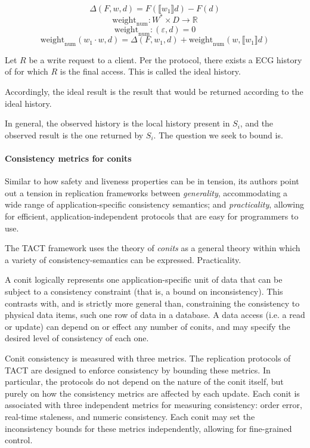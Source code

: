 \[ \Delta(F,w,d) = F(\llbracket w_1 \rrbracket d) - F (d)\]
\[ \textrm{weight}_{\textrm{num}} : W^\ast \times D \to \mathbb{R}\]
\[ \textrm{weight}_{\textrm{num}} : (\varepsilon, d) = 0 \]
\[ \textrm{weight}_{\textrm{num}} (w_1 \cdot w, d) = \Delta(F, w_1, d) + \textrm{weight}_{\textrm{num}} \left(w, \llbracket w_1 \rrbracket d\right) \]

Let $R$ be a write request to a client. Per the protocol, there exists
a ECG history of for which $R$ is the final access. This is called the
ideal history.

Accordingly, the ideal result is the result that would be returned
according to the ideal history.

In general, the observed history is the local history present in
$S_i$, and the observed result is the one returned by $S_i$. The
question we seek to bound is.


\paragraph{Consistency metrics for conits}

Similar to how safety and liveness properties can be in tension, its
authors point out a tension in replication frameworks between
\emph{generality}, accommodating a wide range of application-specific
consistency semantics; and \emph{practicality}, allowing for
efficient, application-independent protocols that are easy for
programmers to use.

The TACT framework uses the theory of
\emph{conits} as a general theory within which a variety of
consistency-semantics can be expressed. Practicality.

A conit logically represents one application-specific unit of data
that can be subject to a consistency constraint (that is, a bound on
inconsistency). This contrasts with, and is strictly more general
than, constraining the consistency to physical data items, such one
row of data in a database. A data access (i.e. a read or update) can
depend on or effect any number of conits, and may specify the desired
level of consistency of each one.

Conit consistency is measured with three metrics. The replication
protocols of TACT are designed to enforce consistency by bounding
these metrics. In particular, the protocols do not depend on the
nature of the conit itself, but purely on how the consistency metrics
are affected by each update. Each conit is associated with three
independent metrics for measuring consistency: order error, real-time
staleness, and numeric consistency. Each conit may set the
inconsistency bounds for these metrics independently, allowing for
fine-grained control.

